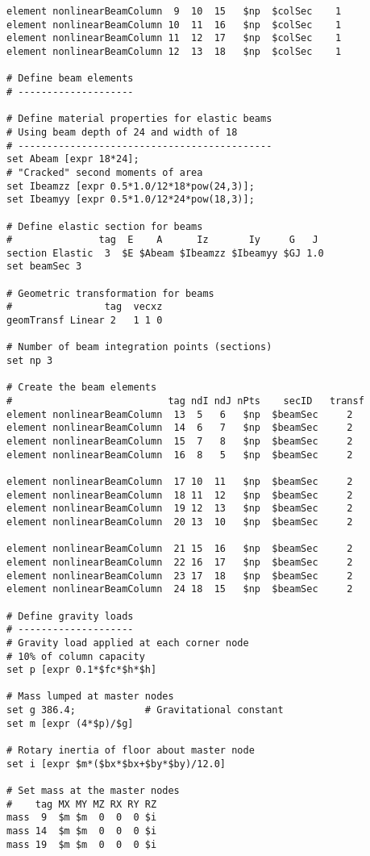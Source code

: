 \documentclass[12pt]{article}
\begin{document}
{\begin{verbatim}
element nonlinearBeamColumn  9  10  15   $np  $colSec    1
element nonlinearBeamColumn 10  11  16   $np  $colSec    1
element nonlinearBeamColumn 11  12  17   $np  $colSec    1
element nonlinearBeamColumn 12  13  18   $np  $colSec    1

# Define beam elements
# --------------------

# Define material properties for elastic beams
# Using beam depth of 24 and width of 18
# --------------------------------------------
set Abeam [expr 18*24];
# "Cracked" second moments of area
set Ibeamzz [expr 0.5*1.0/12*18*pow(24,3)];
set Ibeamyy [expr 0.5*1.0/12*24*pow(18,3)];

# Define elastic section for beams
#               tag  E    A      Iz       Iy     G   J
section Elastic  3  $E $Abeam $Ibeamzz $Ibeamyy $GJ 1.0
set beamSec 3

# Geometric transformation for beams
#                tag  vecxz
geomTransf Linear 2   1 1 0

# Number of beam integration points (sections)
set np 3

# Create the beam elements
#                           tag ndI ndJ nPts    secID   transf
element nonlinearBeamColumn  13  5   6   $np  $beamSec     2
element nonlinearBeamColumn  14  6   7   $np  $beamSec     2
element nonlinearBeamColumn  15  7   8   $np  $beamSec     2
element nonlinearBeamColumn  16  8   5   $np  $beamSec     2

element nonlinearBeamColumn  17 10  11   $np  $beamSec     2
element nonlinearBeamColumn  18 11  12   $np  $beamSec     2
element nonlinearBeamColumn  19 12  13   $np  $beamSec     2
element nonlinearBeamColumn  20 13  10   $np  $beamSec     2

element nonlinearBeamColumn  21 15  16   $np  $beamSec     2
element nonlinearBeamColumn  22 16  17   $np  $beamSec     2
element nonlinearBeamColumn  23 17  18   $np  $beamSec     2
element nonlinearBeamColumn  24 18  15   $np  $beamSec     2

# Define gravity loads
# --------------------
# Gravity load applied at each corner node
# 10% of column capacity
set p [expr 0.1*$fc*$h*$h]

# Mass lumped at master nodes
set g 386.4;            # Gravitational constant
set m [expr (4*$p)/$g]

# Rotary inertia of floor about master node
set i [expr $m*($bx*$bx+$by*$by)/12.0]

# Set mass at the master nodes
#    tag MX MY MZ RX RY RZ
mass  9  $m $m  0  0  0 $i
mass 14  $m $m  0  0  0 $i
mass 19  $m $m  0  0  0 $i


\end{verbatim}}
\end{document}
